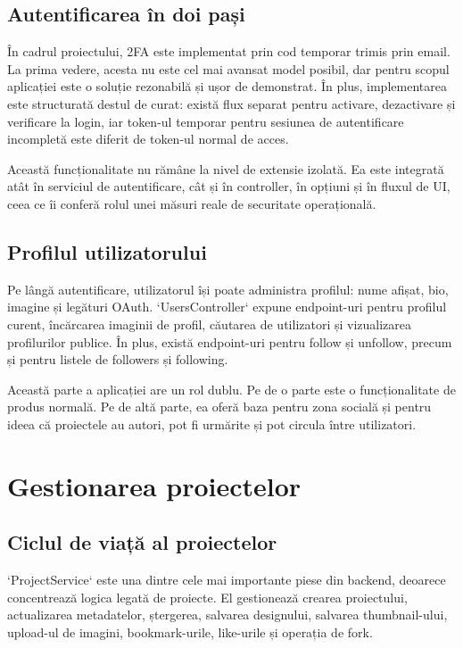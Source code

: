 \subsection{Autentificarea în doi pași}

În cadrul proiectului, 2FA este implementat prin cod temporar trimis prin email. La prima vedere, acesta nu este cel mai avansat model posibil, dar pentru scopul aplicației este o soluție rezonabilă și ușor de demonstrat. În plus, implementarea este structurată destul de curat: există flux separat pentru activare, dezactivare și verificare la login, iar token-ul temporar pentru sesiunea de autentificare incompletă este diferit de token-ul normal de acces.

Această funcționalitate nu rămâne la nivel de extensie izolată. Ea este integrată atât în serviciul de autentificare, cât și în controller, în opțiuni și în fluxul de UI, ceea ce îi conferă rolul unei măsuri reale de securitate operațională.

\subsection{Profilul utilizatorului}

Pe lângă autentificare, utilizatorul își poate administra profilul: nume afișat, bio, imagine și legături OAuth. `UsersController` expune endpoint-uri pentru profilul curent, încărcarea imaginii de profil, căutarea de utilizatori și vizualizarea profilurilor publice. În plus, există endpoint-uri pentru follow și unfollow, precum și pentru listele de followers și following.

Această parte a aplicației are un rol dublu. Pe de o parte este o funcționalitate de produs normală. Pe de altă parte, ea oferă baza pentru zona socială și pentru ideea că proiectele au autori, pot fi urmărite și pot circula între utilizatori.

\section{Gestionarea proiectelor}

\subsection{Ciclul de viață al proiectelor}

`ProjectService` este una dintre cele mai importante piese din backend, deoarece concentrează logica legată de proiecte. El gestionează crearea proiectului, actualizarea metadatelor, ștergerea, salvarea designului, salvarea thumbnail-ului, upload-ul de imagini, bookmark-urile, like-urile și operația de fork.

